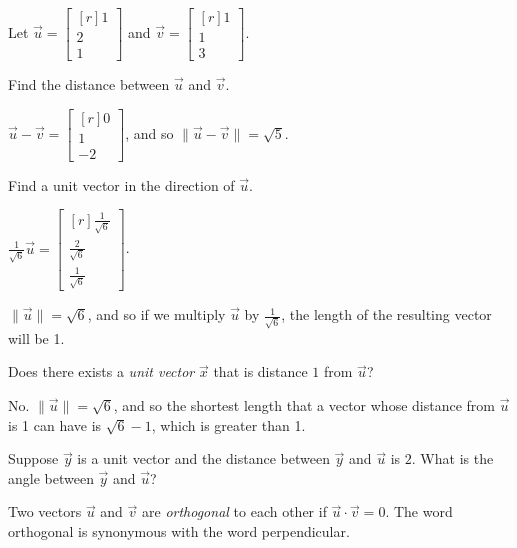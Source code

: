 \documentclass{problemset}
\newcommand{\mat}[1]{\begin{bmatrix*}[r]#1\end{bmatrix*}}
\begin{document}
	\question
	Let $\vec u=\mat{1\\2\\1}$ and $\vec v=\mat{1\\1\\3}$.
	\begin{parts}
		\item Find the distance between $\vec u$ and $\vec v$.
			\begin{solution}
				$\vec u - \vec v = \mat{0\\1\\-2}$, and so $\|\vec u-\vec v\| = \sqrt{5}$. 
			\end{solution}
		\item Find a unit vector in the direction of $\vec u$.
			\begin{solution}
				$\frac{1}{\sqrt{6}} \vec u = \mat{\frac{1}{\sqrt{6}}\\\frac{2}{\sqrt{6}}\\\frac{1}{\sqrt{6}}}$.

				$\|\vec u\| = \sqrt{6}$, and so if we multiply $\vec u$ by $\frac{1}{\sqrt{6}}$,
				the length of the resulting vector will be 1. 
			\end{solution}
		\item Does there exists a \emph{unit vector} $\vec x$ that is distance
			$1$ from $\vec u$?
			\begin{solution}
				No. $\|\vec u\| = \sqrt{6}$, and so the shortest length that a
				vector whose distance from $\vec u$ is 1 can have is $\sqrt{6} - 1$, 
				which is greater than 1. 
			\end{solution}
		\item Suppose $\vec y$ is a unit vector and the distance between $\vec y$ and
			$\vec u$ is $2$.  What is the angle between $\vec y$ and $\vec u$?
	\end{parts}


	\begin{definition}[Orthogonal]
		Two vectors $\vec u$ and $\vec v$ are \emph{orthogonal} to each other
		if $\vec u\cdot \vec v=0$.  The word orthogonal is synonymous with the
		word perpendicular.
	\end{definition}
	
\end{document}
